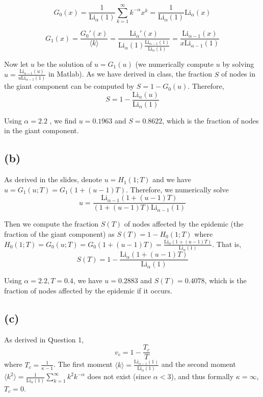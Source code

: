 \documentclass{article}
\begin{document}
$$ G_0(x) = \frac{1}{\mathrm{Li}_\alpha(1)}\sum_{k=1}^{\infty}k^{-\alpha}x^k = \frac{1}{\mathrm{Li}_\alpha(1)}\mathrm{Li}_\alpha(x)$$

$$ G_1(x) =\frac{G_0'(x)}{\langle k \rangle} =  \frac{\mathrm{Li}_\alpha '(x)}{\mathrm{Li}_\alpha(1) \frac{\mathrm{Li}_{\alpha-1}(1)}{\mathrm{Li}_\alpha(1)}} = \frac{\mathrm{Li}_{\alpha-1}(x)}{x\mathrm{Li}_{\alpha-1}(1)}$$

Now let $ u $ be the solution of $ u = G_1(u) $ (we  numerically compute $ u $ by solving $ u =   \frac{\mathrm{Li}_{\alpha-1}(u)}{u\mathrm{Li}_{\alpha-1}(1)}$ in Matlab). As we have derived in class, the fraction $ S $ of nodes in the giant component can be computed by $ S = 1 - G_0(u) $. Therefore, $$ S = 1 - \frac{\mathrm{Li}_\alpha(u)}{\mathrm{Li}_\alpha(1)} $$

Using $ \alpha = 2.2 $ , we find $ u = 0.1963 $ and $ S = 0.8622 $, which is the fraction of nodes in the giant component.

\subsection*{(b)}
As derived in the slides, denote $ u = H_1(1;T) $ and we have $ u = G_1(u;T) = G_1(1+(u-1)T) $. Therefore, we numerically solve $$ u =  \frac{\mathrm{Li}_{\alpha-1}(1+(u-1)T)}{(1+(u-1)T)\mathrm{Li}_{\alpha-1}(1)}$$

Then we compute the fraction $ S(T) $ of nodes affected by the epidemic (the fraction of the giant component) as $ S(T) = 1 - H_0(1;T) $ where $ H_0(1;T) = G_0(u;T) =  G_0(1+(u-1)T) = \frac{\mathrm{Li}_\alpha(1+(u-1)T)}{\mathrm{Li}_\alpha(1)} $. That is, $$ S(T) = 1 - \frac{\mathrm{Li}_\alpha(1+(u-1)T)}{\mathrm{Li}_\alpha(1)} $$

Using $ \alpha=2.2, T=0.4 $, we have $ u =  0.2883 $ and $ S(T) = 0.4078
 $, which is the fraction of nodes affected by the epidemic if it occurs. 

\subsection*{(c)}
As derived in Question 1, $$v_c = 1 - \frac{T_c}{T} $$ where  $ T_c =    \frac{1}{\kappa - 1}$. The first moment $ \langle k \rangle = \frac{\mathrm{Li}_{\alpha-1}(1)}{\mathrm{Li}_{\alpha}(1)}$ and the second moment  $ \langle k^2 \rangle = \frac{1}{\mathrm{Li}_\alpha(1)}\sum_{k=1}^{\infty}k^2 k^{-\alpha} $ does not exist (since $ \alpha<3 $),  and thus formally $ \kappa = \infty $, $ T_c = 0 $.
\end{document}
